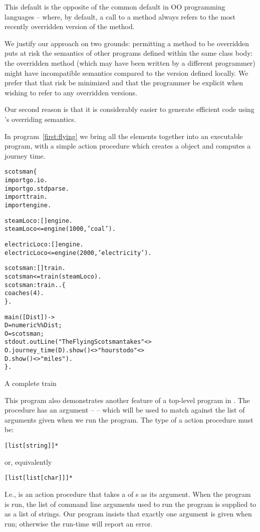 \begin{aside}
This default is the opposite of the common default in OO programming languages -- where, by default, a call to a method always refers to the most recently overridden version of the method. 

We justify our approach on two grounds: permitting a method to be overridden puts at risk the semantics of other programs defined within the same class body: the overridden method (which may have been written by a different programmer) might have incompatible semantics compared to the version defined locally. We prefer that that risk be minimized and that the programmer be explicit when wishing to refer to any overridden versions.

Our second reason is that it is considerably easier to generate efficient code using \go's overriding semantics.
\end{aside}

In program~\vref{first:flying} we bring all the elements together into an executable program, with a simple  action procedure which creates a  object and computes a journey time.
\begin{program}[bt]
\vspace{0.5ex}
\begin{alltt}
 scotsman\{
  import go.io.
  import go.stdparse.
  import train.
  import engine.

  steamLoco:[]\conarrow{}engine.
  steamLoco <= engine(1000,'coal').

  electricLoco:[]\conarrow{}engine.
  electricLoco <= engine(2000,'electricity').

  scotsman:[]\conarrow{}train.
  scotsman <= train(steamLoco).
  scotsman:train..\{
    coaches(4).
  \}.
  
  main([Dist]) ->
      D = numeric\%\%Dist;
      O = scotsman;
      stdout.outLine("The Flying Scotsman takes "<>
        O.journey_time(D).show()<>"hours to do "<>
        D.show()<>" miles").
\}.
\end{alltt}
\vspace{-2ex}
\caption{A complete train\label{first:flying}}
\end{program}
This program also demonstrates another feature of a top-level program in \go. The  procedure has an argument -- \q{[Dist]} -- which will be used to match against the list of arguments given when we run the program. The type of a  action procedure must be:
\begin{alltt}
[list[string]]*
\end{alltt}
or, equivalently
\begin{alltt}
[list[list[char]]]*
\end{alltt}
I.e.,  is an action procedure that takes a  of s as its argument. When the  program is run, the list of command line arguments used to run the program is supplied to  as a list of strings. Our  program insists that exactly one argument is given when run; otherwise the \go run-time will report an error.

